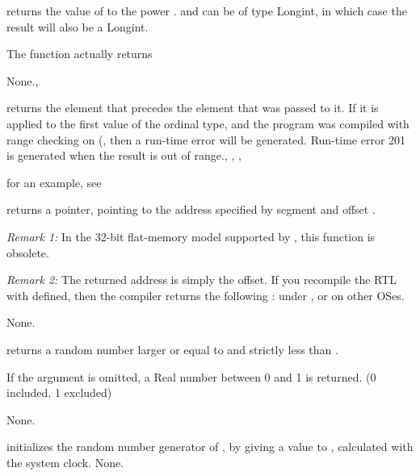 \documentclass{report}
\begin{document}
\html{}

{
 returns the value of  to the power . 
 and  can be of type Longint, in which case the 
result will also be a Longint.
 
The function actually returns 
}{None.}{, }

\html{}

{  returns the element that precedes the element that was passed
to it. If it is applied to the first value of the ordinal type, and the
program was compiled with range checking on (, then a run-time
error will be generated.
}{Run-time error 201 is generated when the result is out of
range.}{, , , }

for an example, see 
\html{}

{
 returns a pointer, pointing to the address specified by
segment  and offset .

{\em Remark 1:} In the 32-bit flat-memory model supported by \fpc, this
function is obsolete.

{\em Remark 2:} The returned address is simply the offset. If you recompile
the RTL with  defined, then the compiler returns the
following :  under \dos, or
 on other OSes.
}
{None.}
{}

\html{}

{ returns a random number larger or equal to  and
strictly less than .

If the argument  is omitted, a Real number between 0 and 1 is returned.
(0 included, 1 excluded)}
{None.}
{}


\html{}

{ initializes the random number generator of \fpc, by giving
a value to , calculated with the system clock.
}
{None.}
{}
\end{document}
